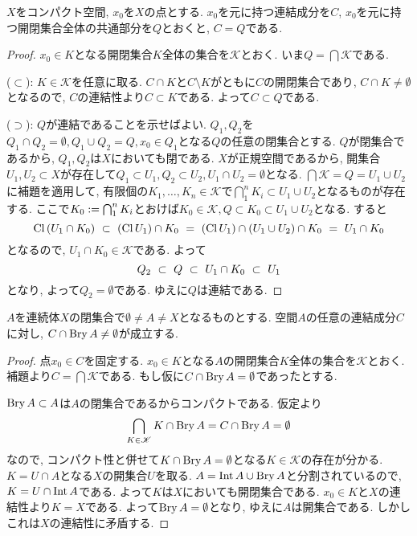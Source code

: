 \documentclass[uplatex, dvipdfmx, a4paper, 12pt, class=jsbook, crop=false]{standalone}
\begin{document}
\begin{lemma}
	$ X $をコンパクト\Hausdorff 空間, $ x_0 $を$ X $の点とする. $ x_0 $を元に持つ連結成分を$ C $, $ x_0 $を元に持つ開閉集合全体の共通部分を$ Q $とおくと, $ C = Q $である.
\end{lemma}
\begin{proof}
	$ x_0 \in K $となる開閉集合$ K $全体の集合を$ \mathscr{K} $とおく. いま$ Q  = \bigcap \mathscr{K}$である.
	
	($ \subset $): $ K \in \mathscr{K} $を任意に取る. $ C \cap K $と$ C \setminus K $がともに$ C $の開閉集合であり, $ C \cap K \neq \emptyset $となるので, $ C $の連結性より$ C \subset K $である. よって$ C \subset Q $である.
	
	($ \supset $): $ Q $が連結であることを示せばよい. $ Q_1, Q_2 $を$ Q_1 \cap Q_2 = \emptyset, Q_1 \cup Q_2 = Q , x_0 \in Q_1$となる$ Q $の任意の閉集合とする. $ Q $が閉集合であるから, $ Q_1, Q_2 $は$ X $においても閉である. $ X $が正規空間であるから, 開集合$ U_1, U_2 \subset X $が存在して$ Q_1 \subset U_1, Q_2 \subset U_2, U_1 \cap U_2 = \emptyset $となる. $\bigcap \mathscr{K} = Q = U_1 \cup U_2 $に補題を適用して, 有限個の$ K_1 , \ldots, K_n \in \mathscr{K}$で$ \bigcap
	_{1}^{n} K_i \subset U_1 \cup U_2$となるものが存在する. ここで$ K_0 \mathrel{:=} \bigcap
	_{1}^{n} K_i$とおけば$ K_0 \in \mathscr{K}, Q \subset K_0 \subset U_1 \cup U_2 $となる. すると
	\[ \mathop{\mathrm{Cl}}\nolimits\left( U_1 \cap K_0 \right) \ \subset\  \left(\mathop{\mathrm{Cl}}\nolimits U_1 \right) \cap K_0 \ =\  \left(\mathop{\mathrm{Cl}}\nolimits U_1 \right) \cap (U_1 \cup U_2) \cap K_0 \ =\  U_1 \cap K_0\]
	となるので, $ U_1 \cap K_0 \in \mathscr{K} $である. よって
	\[ Q_2 \ \subset\  Q \ \subset\  U_1 \cap K_0 \ \subset\  U_1 \]
	となり, よって$ Q_2 = \emptyset $である. ゆえに$ Q $は連結である.
\end{proof}

\begin{lemma}
	$ A $を連続体$ X $の閉集合で$ \emptyset \neq A \neq X $となるものとする. 空間$ A $の任意の連結成分$ C $に対し, $ C \cap \mathop{\mathrm{Bry}}\nolimits A \neq \emptyset $が成立する.
\end{lemma}
\begin{proof}
	点$ x_0 \in C $を固定する. $ x_0 \in K $となる$ A $の開閉集合$ K $全体の集合を$ \mathscr{K} $とおく. 補題より$ C = \bigcap \mathscr{K} $である. もし仮に$ C \cap \mathop{\mathrm{Bry}}\nolimits A = \emptyset $であったとする.
	
	$ \mathop{\mathrm{Bry}}\nolimits A \subset A $は$ A $の閉集合であるからコンパクトである. 仮定より
	\[ \bigcap_{K \in \mathscr{K}} K \cap \mathop{\mathrm{Bry}}\nolimits A = C \cap \mathop{\mathrm{Bry}}\nolimits A = \emptyset \]
	なので, コンパクト性と併せて$ K \cap \mathop{\mathrm{Bry}}\nolimits A = \emptyset $となる$ K \in \mathscr{K} $の存在が分かる. $ K = U \cap A  $となる$ X $の開集合$ U $を取る. $ A = \mathop{\mathrm{Int}}\nolimits A \cup \mathop{\mathrm{Bry}}\nolimits A $と分割されているので, $ K = U \cap \mathop{\mathrm{Int}}\nolimits A $である. よって$ K $は$ X $においても開閉集合である. $x_0 \in K $と$ X $の連結性より$ K = X $である. よって$ \mathop{\mathrm{Bry}}\nolimits A = \emptyset $となり, ゆえに$ A $は開集合である. しかしこれは$ X $の連結性に矛盾する.
\end{proof}
\end{document}
